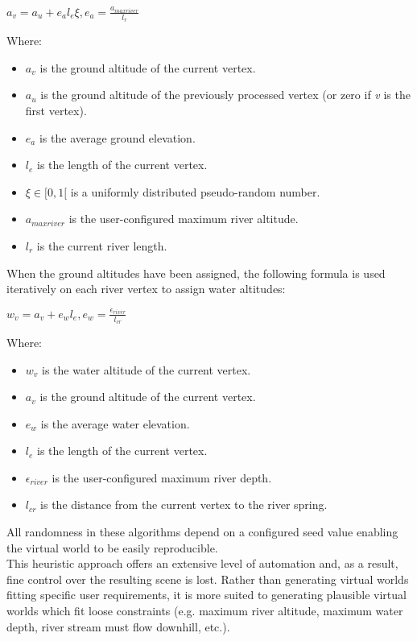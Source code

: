 \begin{center}
$a_{v} = a_{u} + e_{a}l_{e}\xi , e_{a} = \frac{a_{maxriver}}{l_{r}} $ \\
\end{center}

Where:
\begin{itemize}
\item $a_{v}$ is the ground altitude of the current vertex.
\item $a_{u}$ is the ground altitude of the previously processed vertex (or zero if \textit{v} is the first vertex).
\item $e_{a}$ is the average ground elevation.
\item $l_{e}$ is the length of the current vertex.
\item $\xi \in [0,1[$ is a uniformly distributed pseudo-random number.
\item $a_{maxriver}$ is the user-configured maximum river altitude.
\item $l_{r}$ is the current river length.
\end{itemize}

When the ground altitudes have been assigned, the following formula is used iteratively on each river vertex to assign water altitudes:

\begin{center}
$w_{v} = a_{v} + e_{w}l_{e}, e_{w} = \frac{\epsilon_{river}}{l_{cr}} $
\end{center}

Where:
\begin{itemize}
\item $w_{v}$ is the water altitude of the current vertex.
\item $a_{v}$ is the ground altitude of the current vertex.
\item $e_{w}$ is the average water elevation.
\item $l_{e}$ is the length of the current vertex.
\item $\epsilon_{river}$ is the user-configured maximum river depth.
\item $l_{cr}$ is the distance from the current vertex to the river spring.
\end{itemize}

All randomness in these algorithms depend on a configured seed value enabling the virtual world to be easily reproducible.  \\

This heuristic approach offers an extensive level of automation and, as a result, fine control over the resulting scene is lost. Rather than generating virtual worlds fitting specific user requirements, it is more suited to generating plausible virtual worlds which fit loose constraints (e.g. maximum river altitude, maximum water depth, river stream must flow downhill, etc.). 

